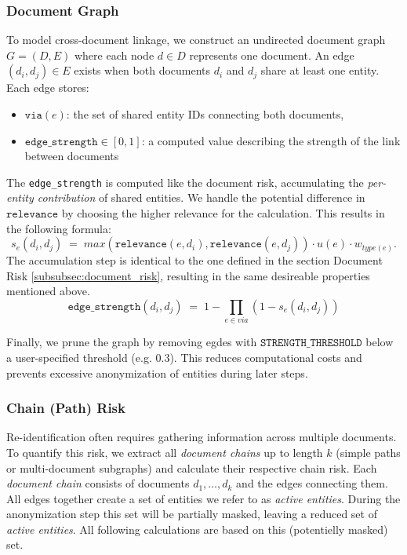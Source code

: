 \subsubsection{Document Graph}
To model cross-document linkage, we construct an undirected document graph $G=(D,E)$ where each node $d\in D$ represents one document. An edge $(d_i,d_j)\in E$ exists when both documents $d_i$ and $d_j$ share at least one entity. Each edge stores:
\begin{itemize}
\item $\texttt{via}(e)$: the set of shared entity IDs connecting both documents,
\item $\texttt{edge\_strength}\in[0,1]$: a computed value describing the strength of the link between documents
\end{itemize}
The \texttt{edge\_strength} is computed like the document risk, accumulating the \textit{per-entity contribution} of shared entities. We handle the potential difference in $\texttt{relevance}$ by choosing the higher relevance for the calculation. This results in the following formula:
\[
s_e(d_i, d_j) \; =\; max(\texttt{relevance}(e,d_i), \texttt{relevance}(e,d_j)) \cdot u(e) \cdot w_{type(e)}.
\]
The accumulation step is identical to the one defined in the section Document Risk \ref{subsubsec:document_risk}, resulting in the same desireable properties mentioned above.
\[
\texttt{edge\_strength}(d_i,d_j) \;=\; 1 - \prod_{e\in{via}}(1 - s_e(d_i,d_j))
\]

Finally, we prune the graph by removing egdes with $\texttt{STRENGTH\_THRESHOLD}$ below a user-specified threshold (e.g. $0.3$). This reduces computational costs and prevents excessive anonymization of entities during later steps. 

\subsubsection{Chain (Path) Risk}\label{subsubsec:chain_risk}
Re-identification often requires gathering information across multiple documents. To quantify this risk, we extract all \textit{document chains} up to length $k$ (simple paths or multi-document subgraphs) and calculate their respective chain risk. Each \textit{document chain} consists of documents $d_1,\dots,d_k$ and the edges connecting them. All edges together create a set of entities we refer to as \textit{active entities}. During the anonymization step this set will be partially masked, leaving a reduced set of \textit{active entities}. All following calculations are based on this (potentielly masked) set.

